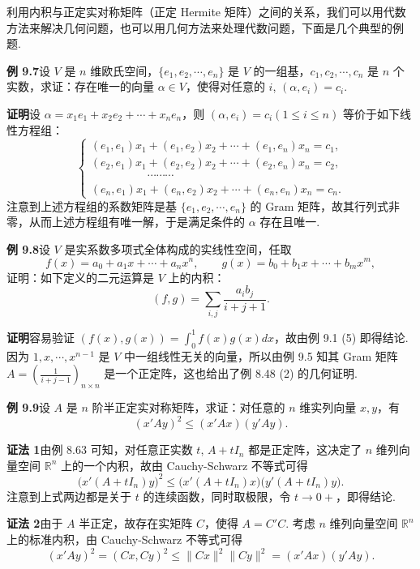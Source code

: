\documentclass[UTF8,12pt,a4paper,fontset=fandol]{ctexart}
\begin{document}
利用内积与正定实对称矩阵（正定 Hermite 矩阵）之间的关系，我们可以用代数方法来解决几何问题，也可以用几何方法来处理代数问题，下面是几个典型的例题.

\noindent\textbf{例 9.7}\quad 设 $V$ 是 $n$ 维欧氏空间，$\{e_1,e_2,\cdots,e_n\}$ 是 $V$ 的一组基，$c_1,c_2,\cdots,c_n$ 是 $n$ 个实数，求证：存在唯一的向量 $\alpha\in V$，使得对任意的 $i$, $(\alpha,e_i)=c_i$.

\noindent\textbf{证明}\quad 设 $\alpha=x_1e_1+x_2e_2+\cdots+x_ne_n$，则 $(\alpha,e_i)=c_i(1\le i\le n)$ 等价于如下线性方程组：
\[
\left\{
\begin{array}{l}
(e_1,e_1)x_1+(e_1,e_2)x_2+\cdots+(e_1,e_n)x_n=c_1,\\
(e_2,e_1)x_1+(e_2,e_2)x_2+\cdots+(e_2,e_n)x_n=c_2,\\
\hspace{5em}\cdots\cdots\cdots\\
(e_n,e_1)x_1+(e_n,e_2)x_2+\cdots+(e_n,e_n)x_n=c_n.
\end{array}
\right.
\]
注意到上述方程组的系数矩阵是基 $\{e_1,e_2,\cdots,e_n\}$ 的 Gram 矩阵，故其行列式非零，从而上述方程组有唯一解，于是满足条件的 $\alpha$ 存在且唯一.

\noindent\textbf{例 9.8}\quad 设 $V$ 是实系数多项式全体构成的实线性空间，任取
\[
f(x)=a_0+a_1x+\cdots+a_nx^n,\qquad
g(x)=b_0+b_1x+\cdots+b_mx^m,
\]
证明：如下定义的二元运算是 $V$ 上的内积：
\[
(f,g)=\sum_{i,j}\frac{a_ib_j}{i+j+1}.
\]

\noindent\textbf{证明}\quad 容易验证 $(f(x),g(x))=\int_0^1 f(x)g(x)dx$，故由例 9.1 (5) 即得结论. 因为 $1,x,\cdots,x^{n-1}$ 是 $V$ 中一组线性无关的向量，所以由例 9.5 知其 Gram 矩阵 $A=\left(\frac1{i+j-1}\right)_{n\times n}$ 是一个正定阵，这也给出了例 8.48 (2) 的几何证明.

\noindent\textbf{例 9.9}\quad 设 $A$ 是 $n$ 阶半正定实对称矩阵，求证：对任意的 $n$ 维实列向量 $x,y$，有
\[
(x'Ay)^2\le (x'Ax)(y'Ay).
\]

\noindent\textbf{证法 1}\quad 由例 8.63 可知，对任意正实数 $t$, $A+tI_n$ 都是正定阵，这决定了 $n$ 维列向量空间 $\mathbb{R}^n$ 上的一个内积，故由 Cauchy-Schwarz 不等式可得
\[
\bigl(x'(A+tI_n)y\bigr)^2\le \bigl(x'(A+tI_n)x\bigr)\bigl(y'(A+tI_n)y\bigr).
\]
注意到上式两边都是关于 $t$ 的连续函数，同时取极限，令 $t\to 0+$，即得结论.

\noindent\textbf{证法 2}\quad 由于 $A$ 半正定，故存在实矩阵 $C$，使得 $A=C'C$. 考虑 $n$ 维列向量空间 $\mathbb{R}^n$ 上的标准内积，由 Cauchy-Schwarz 不等式可得
\[
(x'Ay)^2=(Cx,Cy)^2\le \|Cx\|^2\|Cy\|^2=(x'Ax)(y'Ay).
\]
\end{document}
